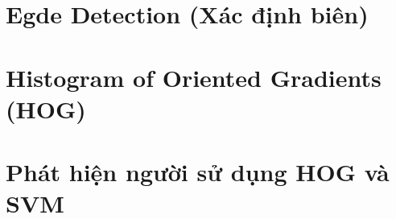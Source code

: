 \documentclass[12pt]{report}
\begin{document}


\tableofcontents 
\newpage

\newpage
\setcounter{page}{1}

\section{Egde Detection (Xác định biên)}


\section{Histogram of Oriented Gradients (HOG)}


\section{Phát hiện người sử dụng HOG và SVM}


{}

\end{document}
